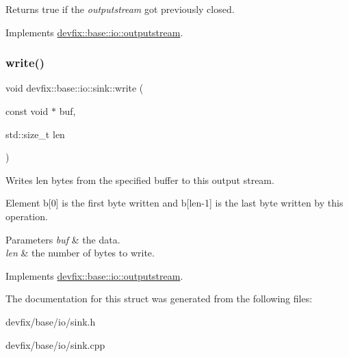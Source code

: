 \begin{DoxyReturn}{Returns}
true if the {\itshape outputstream} got previously closed. 
\end{DoxyReturn}


Implements \hyperlink{structdevfix_1_1base_1_1io_1_1outputstream_a52bd2eac8f6fbc496eab5138a48d2f06}{devfix\+::base\+::io\+::outputstream}.

\mbox{\label{structdevfix_1_1base_1_1io_1_1sink_a6eade9933d316139e952b7a442f3c56d}} 
\subsubsection{\texorpdfstring{write()}{write()}}
{\footnotesize\ttfamily void devfix\+::base\+::io\+::sink\+::write (\begin{DoxyParamCaption}\item[{const void $\ast$}]{buf,  }\item[{std\+::size\+\_\+t}]{len }\end{DoxyParamCaption})\hspace{0.3cm}{\ttfamily [virtual]}}



Writes len bytes from the specified buffer to this output stream. 

Element b\mbox{[}0\mbox{]} is the first byte written and b\mbox{[}len-\/1\mbox{]} is the last byte written by this operation.


\begin{DoxyParams}{Parameters}
{\em buf} & the data. \\
\hline
{\em len} & the number of bytes to write. \\
\hline
\end{DoxyParams}


Implements \hyperlink{structdevfix_1_1base_1_1io_1_1outputstream_ac7e5fcd6883c7c8f53356a4eb8284c00}{devfix\+::base\+::io\+::outputstream}.



The documentation for this struct was generated from the following files\+:\begin{DoxyCompactItemize}
\item 
devfix/base/io/sink.\+h\item 
devfix/base/io/sink.\+cpp\end{DoxyCompactItemize}
